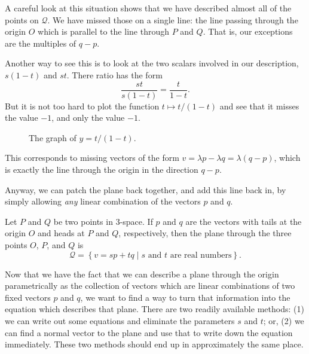 \documentclass[00-livre-main.tex]{subfiles}
\begin{document}
A careful look at this situation shows that we have described almost all of the points on $\mathcal{Q}$. We have missed those on a single line: the line passing through the origin $O$ which is parallel to the line through $P$ and $Q$. That is, our exceptions are the multiples of $q-p$. 

Another way to see this is to look at the two scalars involved in our description, $s(1-t)$ and $st$. There ratio has the form
\[
\frac{st}{s(1-t)} = \frac{t}{1-t}.
\]
But it is not too hard to plot the function $t\mapsto t/(1-t)$ and see that it misses the value $-1$, and only the value $-1$. 

\clearpage
\begin{figure}[h]
\centering
{}
\caption{The graph of $y= t/(1-t)$.}
\label{fig:graph-ratio}
\end{figure}

This corresponds to missing vectors of the form $v = \lambda p - \lambda q = \lambda (q-p)$, which is exactly the line through the origin in the direction $q-p$.


Anyway, we can patch the plane back together, and add this line back in, by simply allowing \emph{any} linear combination of the vectors $p$ and $q$.

\begin{theorem}
Let $P$ and $Q$ be two points in $3$-space. If $p$ and $q$ are the vectors with tails at the origin $O$ and heads at $P$ and $Q$, respectively, then the plane through the three points $O$, $P$, and $Q$ is
\[
\mathcal{Q} = \left\{ v= s p + t q \middle| \text{$s$ and $t$ are real numbers}\right\}.
\]
\end{theorem}

Now that we have the fact that we can describe a plane through the origin parametrically as the collection of vectors which are linear combinations of two fixed vectors $p$ and $q$, we want to find a way to turn that information into the equation which describes that plane. There are two readily available methods: (1) we can write out some equations and eliminate the parameters $s$ and $t$; or, (2) we can find a normal vector to the plane and use that to write down the equation immediately. These two methods should end up in approximately the same place.
\end{document}
